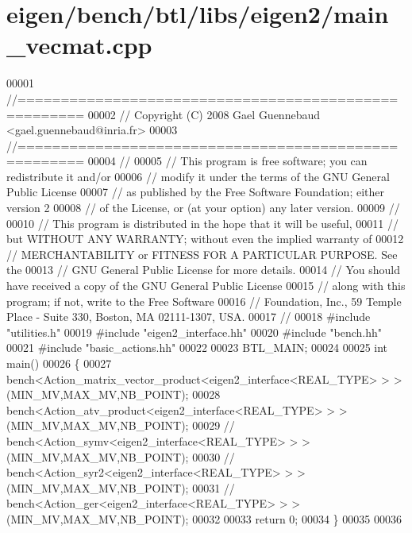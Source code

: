 \hypertarget{eigen_2bench_2btl_2libs_2eigen2_2main__vecmat_8cpp_source}{}\section{eigen/bench/btl/libs/eigen2/main\+\_\+vecmat.cpp}
\label{eigen_2bench_2btl_2libs_2eigen2_2main__vecmat_8cpp_source}

\begin{DoxyCode}
00001 \textcolor{comment}{//=====================================================}
00002 \textcolor{comment}{// Copyright (C) 2008 Gael Guennebaud <gael.guennebaud@inria.fr>}
00003 \textcolor{comment}{//=====================================================}
00004 \textcolor{comment}{//}
00005 \textcolor{comment}{// This program is free software; you can redistribute it and/or}
00006 \textcolor{comment}{// modify it under the terms of the GNU General Public License}
00007 \textcolor{comment}{// as published by the Free Software Foundation; either version 2}
00008 \textcolor{comment}{// of the License, or (at your option) any later version.}
00009 \textcolor{comment}{//}
00010 \textcolor{comment}{// This program is distributed in the hope that it will be useful,}
00011 \textcolor{comment}{// but WITHOUT ANY WARRANTY; without even the implied warranty of}
00012 \textcolor{comment}{// MERCHANTABILITY or FITNESS FOR A PARTICULAR PURPOSE.  See the}
00013 \textcolor{comment}{// GNU General Public License for more details.}
00014 \textcolor{comment}{// You should have received a copy of the GNU General Public License}
00015 \textcolor{comment}{// along with this program; if not, write to the Free Software}
00016 \textcolor{comment}{// Foundation, Inc., 59 Temple Place - Suite 330, Boston, MA  02111-1307, USA.}
00017 \textcolor{comment}{//}
00018 \textcolor{preprocessor}{#include "utilities.h"}
00019 \textcolor{preprocessor}{#include "eigen2\_interface.hh"}
00020 \textcolor{preprocessor}{#include "bench.hh"}
00021 \textcolor{preprocessor}{#include "basic\_actions.hh"}
00022 
00023 BTL\_MAIN;
00024 
00025 \textcolor{keywordtype}{int} main()
00026 \{
00027   bench<Action\_matrix\_vector\_product<eigen2\_interface<REAL\_TYPE> > >(MIN\_MV,MAX\_MV,NB\_POINT);
00028   bench<Action\_atv\_product<eigen2\_interface<REAL\_TYPE> > >(MIN\_MV,MAX\_MV,NB\_POINT);
00029 \textcolor{comment}{//   bench<Action\_symv<eigen2\_interface<REAL\_TYPE> > >(MIN\_MV,MAX\_MV,NB\_POINT);}
00030 \textcolor{comment}{//   bench<Action\_syr2<eigen2\_interface<REAL\_TYPE> > >(MIN\_MV,MAX\_MV,NB\_POINT);}
00031 \textcolor{comment}{//   bench<Action\_ger<eigen2\_interface<REAL\_TYPE> > >(MIN\_MV,MAX\_MV,NB\_POINT);}
00032 
00033   \textcolor{keywordflow}{return} 0;
00034 \}
00035 
00036 
\end{DoxyCode}
